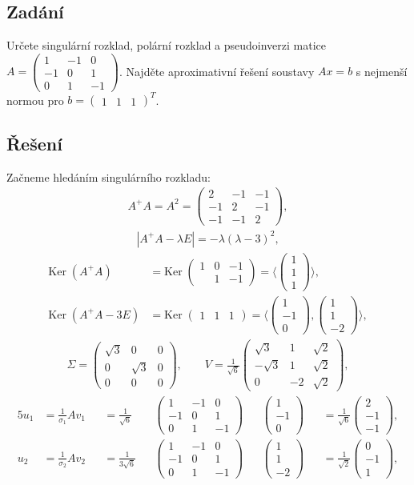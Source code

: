 \documentclass[]{article}
\newcommand{\Ker}{\mathrm{Ker}\;}
\newcommand{\mat}[1]{\begin{pmatrix}#1\end{pmatrix}}
\newcommand{\recip}[1]{\frac{1}{#1}}
\newcommand{\recipsqrt}[1]{\frac{1}{\sqrt{#1}}}
\begin{document}
\subsection{Zadání}
Určete singulární rozklad, polární rozklad a pseudoinverzi matice $A = \mat{
  1 & -1 & 0 \\
  -1 & 0 & 1 \\
  0 & 1 & -1
}$. Najděte aproximativní řešení soustavy $Ax = b$ s nejmenší normou pro $b = \mat{1 & 1 & 1}^T$.

\subsection{Řešení}
Začneme hledáním singulárního rozkladu:
\begin{align*}
  A^+A = A^2 = \mat{
    2 & -1 & -1 \\
    -1 & 2 & -1 \\
    -1 & -1 & 2
  },
\end{align*}
\begin{align*}
  |A^+A - \lambda E| = -\lambda(\lambda-3)^2,
\end{align*}
\begin{align*}
  \Ker(A^+A) &= \Ker\mat{1&0&-1\\&1&-1} = \langle\mat{1\\1\\1}\rangle, \\
  \Ker(A^+A - 3E) &= \Ker\mat{1&1&1} = \langle\mat{1\\-1\\0},\mat{1\\1\\-2}\rangle,
\end{align*}
\begin{align*}
  \Sigma = \mat{
    \sqrt{3} & 0 & 0 \\
    0 & \sqrt{3} & 0 \\
    0 & 0 & 0
  },
  \hspace{2em}
  V =
  \recipsqrt{6}
  \mat{
    \sqrt{3} & 1 & \sqrt{2} \\
    -\sqrt{3} & 1 & \sqrt{2} \\
    0 & -2 & \sqrt{2}
  },
\end{align*}
\begin{alignat*}{5}
  u_1
  &= \recip{\sigma_1} A v_1 &
  &= \recipsqrt{6} &
  &\mat{
    1 & -1 & 0 \\
    -1 & 0 & 1 \\
    0 & 1 & -1
  } &
  &\mat{1 \\ -1 \\ 0} &
  &= \recipsqrt{6}
  \mat{2\\-1\\-1},
  \\
  u_2
  &= \recip{\sigma_2} A v_2 &
  &= \recip{3\sqrt{6}} &
  &\mat{
    1 & -1 & 0 \\
    -1 & 0 & 1 \\
    0 & 1 & -1
  } &
  &\mat{1 \\ 1 \\ -2} &
  &= \recipsqrt{2}
  \mat{0\\-1\\1},
\end{alignat*}
\end{document}
